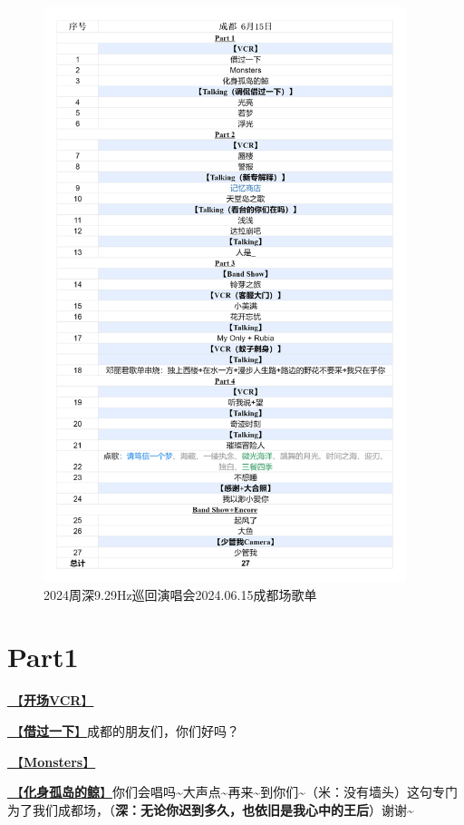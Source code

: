\documentclass[]{ctexbook}
\begin{document}
\begin{figure}

{\centering \includegraphics[width=300pt]{img/playlists/playlists-chengdu-20240615} 

}

\caption{2024周深9.29Hz巡回演唱会2024.06.15成都场歌单}\label{fig:unnamed-chunk-49}
\end{figure}

\newpage

\section{Part1}\label{chengdu-20240615-part1}

\hyperref[opening-vcr]{🎥【\textbf{开场VCR}】}

\hyperref[I-will-go-my-way]{🎵【\textbf{借过一下}】}成都的朋友们，你们好吗？

\hyperref[Monsters]{🎵【\textbf{Monsters}】}

\hyperref[hua-shen-gu-dao-de-jing]{🎵【\textbf{化身孤岛的鲸}】}你们会唱吗\textasciitilde 大声点\textasciitilde 再来\textasciitilde 到你们\textasciitilde（米：没有墙头）这句专门为了我们成都场，（\textbf{深：无论你迟到多久，也依旧是我心中的王后}）谢谢\textasciitilde{}
\end{document}
